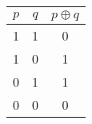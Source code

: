 \documentclass{article}
\newcommand{\lto}{\mathbin{\to}}
\begin{document}
\begin{tabular}{ c c c }
  $p$ & $q$ & $p \oplus q$ \\
  \hline 
  1 & 1 & 0 \\
  1 & 0 & 1 \\
  0 & 1 & 1 \\
  0 & 0 & 0 \\
\end{tabular}

\end{document}
